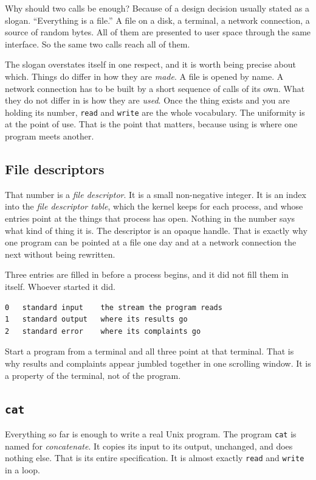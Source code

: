 \documentclass[11pt,a4paper]{article}
\begin{document}
Why should two calls be enough? Because of a design decision usually stated as a slogan.
``Everything is a file.'' A file on a disk, a terminal, a network connection, a source of
random bytes. All of them are presented to user space through the same interface. So the same two
calls reach all of them.

The slogan overstates itself in one respect, and it is worth being precise about which. Things do
differ in how they are \emph{made}. A file is opened by name. A network connection has to be built
by a short sequence of calls of its own. What they do not differ in is how they are \emph{used}.
Once the thing exists and you are holding its number, \texttt{read} and \texttt{write} are the whole
vocabulary. The uniformity is at the point of use. That is the point that matters, because using is
where one program meets another.

\subsection{File descriptors}

That number is a \emph{file descriptor}. It is a small non-negative integer. It is an index into the
\emph{file descriptor table}, which the kernel keeps for each process, and whose entries point at
the things that process has open.
Nothing in the number says what kind of thing it is. The descriptor is an opaque handle. That is
exactly why one program can be pointed at a file one day and at a network connection the next
without being rewritten.

Three entries are filled in before a process begins, and it did not fill them in itself. Whoever
started it did.

\begin{lstlisting}[language=SH]
0   standard input    the stream the program reads
1   standard output   where its results go
2   standard error    where its complaints go
\end{lstlisting}

Start a program from a terminal and all three point at that terminal. That is why results and
complaints appear jumbled together in one scrolling window. It is a property of the terminal, not
of the program.

\subsection{\texttt{cat}}

Everything so far is enough to write a real Unix program. The program \texttt{cat} is named for
\emph{concatenate}. It copies its input to its output, unchanged, and does nothing else. That is
its entire specification. It is almost exactly \texttt{read} and \texttt{write} in a loop.
\end{document}
